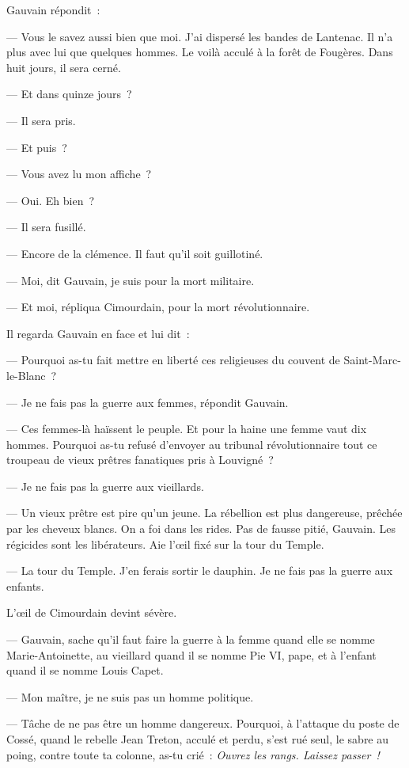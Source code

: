 \documentclass[french,twoside]{book} %
\begin{document}
Gauvain répondit :\par
— Vous le savez aussi bien que moi. J’ai dispersé les bandes de Lantenac. Il n’a plus avec lui que quelques hommes. Le voilà acculé à la forêt de Fougères. Dans huit jours, il sera cerné.\par
— Et dans quinze jours ?\par
— Il sera pris.\par
— Et puis ?\par
— Vous avez lu mon affiche ?\par
— Oui. Eh bien ?\par
— Il sera fusillé.\par
— Encore de la clémence. Il faut qu’il soit guillotiné.\par
— Moi, dit Gauvain, je suis pour la mort militaire.\par
— Et moi, répliqua Cimourdain, pour la mort révolutionnaire.\par
Il regarda Gauvain en face et lui dit :\par
— Pourquoi as-tu fait mettre en liberté ces religieuses du couvent de Saint-Marc-le-Blanc ?\par
— Je ne fais pas la guerre aux femmes, répondit Gauvain.\par
— Ces femmes-là haïssent le peuple. Et pour la haine une femme vaut dix hommes. Pourquoi as-tu refusé d’envoyer au tribunal révolutionnaire tout ce troupeau de vieux prêtres fanatiques pris à Louvigné ?\par
— Je ne fais pas la guerre aux vieillards.\par
 — Un vieux prêtre est pire qu’un jeune. La rébellion est plus dangereuse, prêchée par les cheveux blancs. On a foi dans les rides. Pas de fausse pitié, Gauvain. Les régicides sont les libérateurs. Aie l’œil fixé sur la tour du Temple.\par
— La tour du Temple. J’en ferais sortir le dauphin. Je ne fais pas la guerre aux enfants.\par
L’œil de Cimourdain devint sévère.\par
— Gauvain, sache qu’il faut faire la guerre à la femme quand elle se nomme Marie-Antoinette, au vieillard quand il se nomme Pie VI, pape, et à l’enfant quand il se nomme Louis Capet.\par
— Mon maître, je ne suis pas un homme politique.\par
— Tâche de ne pas être un homme dangereux. Pourquoi, à l’attaque du poste de Cossé, quand le rebelle Jean Treton, acculé et perdu, s’est rué seul, le sabre au poing, contre toute ta colonne, as-tu crié : \emph{Ouvrez les rangs. Laissez passer !}\par
\end{document}
